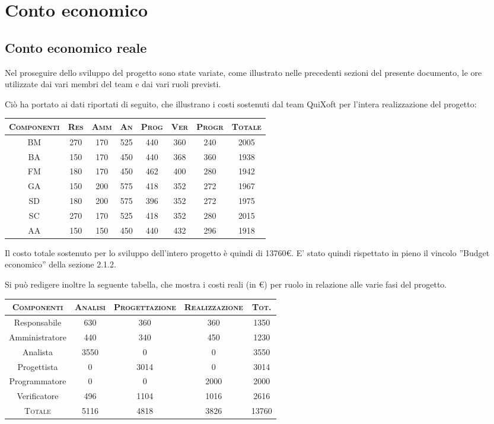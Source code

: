 \documentclass[11pt,a4paper]{article}
\begin{document}
\section{Conto economico}
\subsection{Conto economico reale}
Nel proseguire dello sviluppo del progetto sono state variate, come illustrato nelle precedenti sezioni del presente documento, le ore utilizzate dai vari membri del team e dai vari ruoli previsti.

Ciò ha portato ai dati riportati di seguito, che illustrano i costi sostenuti dal team QuiXoft per l'intera realizzazione del progetto:
\\
\begin{center}
\begin{tabular}{|c||c|c|c|c|c|c||c|}
\hline
\textsc{Componenti} & \textsc{Res} & \textsc{Amm} & \textsc{An} & \textsc{Prog} & \textsc{Ver} & \textsc{Progr} & \textsc{Totale}\\
\hline \hline
BM & 270 & 170 & 525 & 440 & 360 & 240 & 2005 \\ \hline
BA & 150 & 170 & 450 & 440 & 368 & 360 & 1938 \\ \hline
FM & 180 & 170 & 450 & 462 & 400 & 280 & 1942 \\ \hline
GA & 150 & 200 & 575 & 418 & 352 & 272 & 1967  \\ \hline
SD & 180 & 200 & 575 & 396 & 352 & 272 & 1975 \\ \hline
SC & 270 & 170 & 525 & 418 & 352 & 280 & 2015 \\ \hline
AA & 150 & 150 & 450 & 440 & 432 & 296 & 1918 \\ \hline
\end{tabular}
\end{center}
\bigskip
Il costo totale sostenuto per lo sviluppo dell'intero progetto è quindi di 13760\euro. E' stato quindi rispettato in pieno il vincolo ''Budget economico'' della sezione 2.1.2.

Si può redigere inoltre la seguente tabella, che mostra i costi reali (in \euro) per ruolo in relazione alle varie fasi del progetto.
\begin{center}
\begin{tabular}{|c||c|c|c||c|}
\hline
\textsc{Componenti}& \textsc{Analisi} & \textsc{Progettazione} & \textsc{Realizzazione} & \textsc{Tot.} \\ \hline \hline
Responsabile & 630 & 360 & 360 & 1350 \\ \hline
Amministratore & 440 & 340 & 450 & 1230 \\ \hline
Analista & 3550 & 0 & 0 & 3550 \\ \hline
Progettista & 0 & 3014 & 0 & 3014 \\ \hline
Programmatore & 0 & 0 & 2000 & 2000 \\ \hline
Verificatore & 496 & 1104 & 1016 & 2616 \\ \hline \hline
\textsc{Totale} & 5116 & 4818 & 3826 & 13760 \\ \hline
\end{tabular}
\end{center}
\newpage
\end{document}
